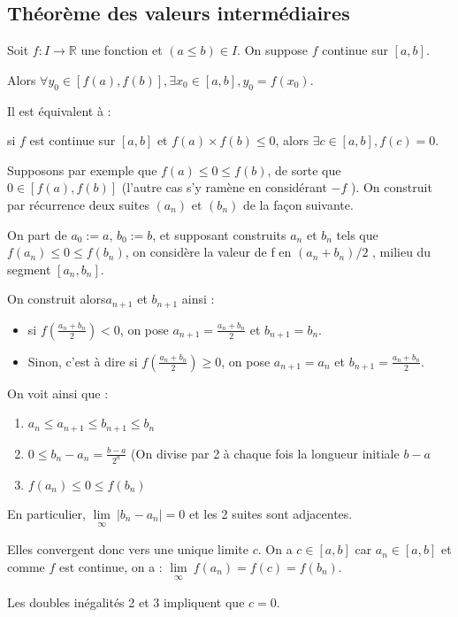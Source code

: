 \documentclass[french]{yLectureNote}
\newcommand{\Lim}[1]{\lim\limits_{\substack{#1}}\:}
\begin{document}
\subsection{Théorème des valeurs intermédiaires}
\begin{theorem}[TVI]
Soit $f:I\to\mathbb{R}$ une fonction et $(a \leq b)\in I$. On suppose $f$ continue sur $[a,b]$.

Alors $\forall y_0 \in [f(a),f(b)], \exists x_0\in[a,b], y_0=f(x_0)$.
\end{theorem}
\begin{theorem}
Il est équivalent à :

si $f$ est continue sur $[a,b]$ et $f(a)\times f(b) \leq 0$, alors $\exists c\in[a,b], f(c)=0$.
\end{theorem}
\begin{myproof}
Supposons par exemple que $f (a) \leq 0 \leq f (b)$, de sorte que $0 \in [f (a), f (b)]$ (l’autre cas s’y ramène en considérant $−f$ ). On construit par récurrence deux suites $(a_n )$ et $(b_n )$
de la façon suivante.

On part de $a_0 := a$, $b_0 := b$, et supposant construits $a_n$ et $b_n$ tels que $f(a_n)\leq 0\leq f(b_n)$,  on considère la valeur de f en $(a_n + b_n )/2$ , milieu du segment $[a_n , b_n ]$.

On construit alors$ a_{n+1}$ et $b_{n+1}$ ainsi :
\begin{itemize}
 \item si $f(\frac{a_n+b_n}{2})<0$, on pose $a_{n+1} = \frac{a_n+b_n}{2}$ et $b_{n+1} = b_n$.
 \item Sinon, c'est à dire si $f(\frac{a_n+b_n}{2}) \geq 0$, on pose $a_{n+1} = a_n$ et $b_{n+1} = \frac{a_n+b_n}{2}$.
\end{itemize}
On voit ainsi que :
\begin{enumerate}
 \item $a_n\leq a_{n+1}\leq b_{n+1}\leq b_n$
 \item $0\leq b_n-a_n = \frac{b-a}{2^n}$ (On divise par 2 à chaque fois la longueur initiale $b-a$
 \item $f(a_n)\leq0\leq f(b_n)$
\end{enumerate}
En particulier, $\Lim{\infty} |b_n-a_n| = 0$ et les 2 suites sont adjacentes.

Elles convergent donc vers une unique limite $c$. On a $c\in[a,b]$ car $a_n\in[a,b]$ et comme $f$ est continue, on a : $\Lim{\infty} f(a_n) = f(c) = f(b_n)$.

Les doubles inégalités 2 et 3 impliquent que $c=0$.
\end{myproof}
\end{document}
